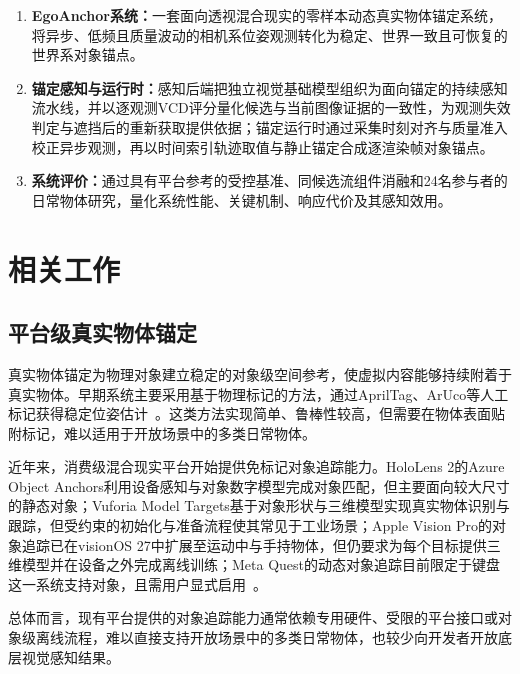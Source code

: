 \documentclass[review]{vgtc}
\begin{document}
\begin{enumerate}
  \item \textbf{EgoAnchor系统：}一套面向透视混合现实的零样本动态真实物体锚定系统，将异步、低频且质量波动的相机系位姿观测转化为稳定、世界一致且可恢复的世界系对象锚点。

  \item \textbf{锚定感知与运行时：}感知后端把独立视觉基础模型组织为面向锚定的持续感知流水线，并以逐观测VCD评分量化候选与当前图像证据的一致性，为观测失效判定与遮挡后的重新获取提供依据；锚定运行时通过采集时刻对齐与质量准入校正异步观测，再以时间索引轨迹取值与静止锚定合成逐渲染帧对象锚点。

  \item \textbf{系统评价：}通过具有平台参考的受控基准、同候选流组件消融和24名参与者的日常物体研究，量化系统性能、关键机制、响应代价及其感知效用。
\end{enumerate}

\section{相关工作}\label{sec:related-work}

\subsection{平台级真实物体锚定}

真实物体锚定为物理对象建立稳定的对象级空间参考，使虚拟内容能够持续附着于真实物体。早期系统主要采用基于物理标记的方法，通过AprilTag、ArUco等人工标记获得稳定位姿估计~\cite{kato1999artoolkit,olson2011apriltag,garridojurado2014aruco}。这类方法实现简单、鲁棒性较高，但需要在物体表面贴附标记，难以适用于开放场景中的多类日常物体。

近年来，消费级混合现实平台开始提供免标记对象追踪能力。HoloLens 2的Azure Object Anchors利用设备感知与对象数字模型完成对象匹配，但主要面向较大尺寸的静态对象；Vuforia Model Targets基于对象形状与三维模型实现真实物体识别与跟踪，但受约束的初始化与准备流程使其常见于工业场景；Apple Vision Pro的对象追踪已在visionOS 27中扩展至运动中与手持物体，但仍要求为每个目标提供三维模型并在设备之外完成离线训练；Meta Quest的动态对象追踪目前限定于键盘这一系统支持对象，且需用户显式启用~\cite{appleObjectAnchor,appleObjectTracking2026,azureObjectAnchors,vuforiaModelTargets,metaDynamicObjectTracker}。

总体而言，现有平台提供的对象追踪能力通常依赖专用硬件、受限的平台接口或对象级离线流程，难以直接支持开放场景中的多类日常物体，也较少向开发者开放底层视觉感知结果。
\end{document}
